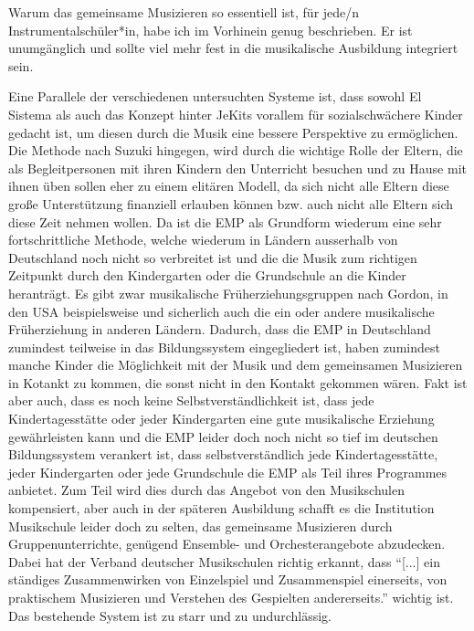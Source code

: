 
Warum das gemeinsame Musizieren so essentiell ist, für jede/n
Instrumentalschüler*in, habe ich im Vorhinein genug beschrieben. Er ist
unumgänglich und sollte viel mehr fest in die musikalische Ausbildung integriert
sein.

Eine Parallele der verschiedenen untersuchten Systeme ist, dass sowohl El
Sistema als auch das Konzept hinter JeKits vorallem für sozialschwächere Kinder
gedacht ist, um diesen durch die Musik eine bessere Perspektive zu ermöglichen.
Die Methode nach Suzuki hingegen, wird durch die wichtige Rolle der Eltern, die
als Begleitpersonen mit ihren Kindern den Unterricht besuchen und zu Hause mit
ihnen üben sollen eher zu einem elitären Modell, da sich nicht alle Eltern diese
große Unterstützung finanziell erlauben können bzw. auch nicht alle Eltern sich
diese Zeit nehmen wollen. Da ist die EMP als Grundform wiederum eine sehr
fortschrittliche Methode, welche wiederum in Ländern ausserhalb von Deutschland
noch nicht so verbreitet ist und die die Musik zum richtigen Zeitpunkt durch den
Kindergarten oder die Grundschule an die Kinder heranträgt. Es gibt zwar
musikalische Früherziehungsgruppen nach Gordon, in den USA beispielsweise und
sicherlich auch die ein oder andere musikalische Früherziehung in anderen
Ländern. Dadurch, dass die EMP in Deutschland zumindest teilweise in das
Bildungssystem eingegliedert ist, haben zumindest manche Kinder die Möglichkeit
mit der Musik und dem gemeinsamen Musizieren in Kotankt zu kommen, die sonst
nicht in den Kontakt gekommen wären. Fakt ist aber auch, dass es noch keine
Selbstverständlichkeit ist, dass jede Kindertagesstätte oder jeder Kindergarten
eine gute musikalische Erziehung gewährleisten kann und die EMP leider doch noch
nicht so tief im deutschen Bildungssystem verankert ist, dass selbstverständlich
jede Kindertagesstätte, jeder Kindergarten oder jede Grundschule die EMP als
Teil ihres Programmes anbietet. Zum Teil wird dies durch das Angebot von den
Musikschulen kompensiert, aber auch in der späteren Ausbildung schafft es die
Institution Musikschule leider doch zu selten, das gemeinsame Musizieren durch
Gruppenunterrichte, genügend Ensemble- und Orchesterangebote abzudecken. Dabei
hat der Verband deutscher Musikschulen richtig erkannt, dass \enquote{[...] ein
ständiges Zusammenwirken von Einzelspiel und Zusammenspiel einerseits, von
praktischem Musizieren und Verstehen des Gespielten andererseits.} wichtig ist.
\autocite[22]{losert:die_kunst_zu_unterrichten} Das bestehende System ist zu
starr und zu undurchlässig.

